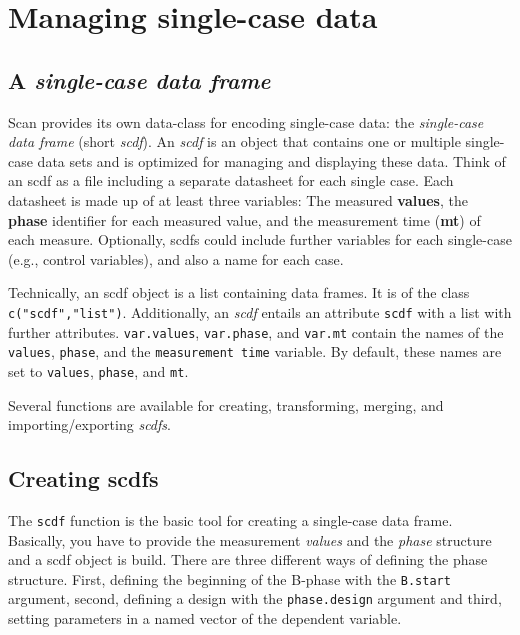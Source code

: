 \documentclass[
]{book}
\makeatletter
\newenvironment{kframe}{%
\medskip{}
\setlength{\fboxsep}{.8em}
 \def\at@end@of@kframe{}%
 \ifinner\ifhmode%
  \def\at@end@of@kframe{\end{minipage}}%
  \begin{minipage}{\columnwidth}%
 \fi\fi%
 \def\FrameCommand##1{\hskip\@totalleftmargin \hskip-\fboxsep
 \colorbox{shadecolor}{##1}\hskip-\fboxsep
     \hskip-\linewidth \hskip-\@totalleftmargin \hskip\columnwidth}%
 \MakeFramed {\advance\hsize-\width
   \@totalleftmargin\z@ \linewidth\hsize
   \@setminipage}}%
 {\par\unskip\endMakeFramed%
 \at@end@of@kframe}
\newenvironment{rmdblock}[1]
  {
  \begin{itemize}
  \renewcommand{\labelitemi}{
    \raisebox{-.7\height}[0pt][0pt]{
      {\setkeys{Gin}{width=3em,keepaspectratio}\texttt{[image: images/\#1]}}
    }
  }
  \setlength{\fboxsep}{1em}
  \begin{kframe}
  \item
  }
  {
  \end{kframe}
  \end{itemize}
  }
\newenvironment{rmdnote}
  {\begin{rmdblock}{bulp}}
{\end{rmdblock}}
\makeatother
\begin{document}
\hypertarget{managing-single-case-data}{%
\chapter{Managing single-case data}\label{managing-single-case-data}}

\hypertarget{a-single-case-data-frame}{%
\section{\texorpdfstring{A \textbf{\emph{single-case data frame}}}{A single-case data frame}}\label{a-single-case-data-frame}}

Scan provides its own data-class for encoding single-case data: the \emph{single-case data frame} (short \emph{scdf}). An \emph{scdf} is an object that contains one or multiple single-case data sets and is optimized for managing and displaying these data. Think of an scdf as a file including a separate datasheet for each single case. Each datasheet is made up of at least three variables: The measured \textbf{values}, the \textbf{phase} identifier for each measured value, and the measurement time (\textbf{mt}) of each measure. Optionally, scdfs could include further variables for each single-case (e.g., control variables), and also a name for each case.

\begin{rmdnote}
Technically, an scdf object is a list containing data frames. It is of
the class \texttt{c("scdf","list")}. Additionally, an \emph{scdf}
entails an attribute \texttt{scdf} with a list with further attributes.
\texttt{var.values}, \texttt{var.phase}, and \texttt{var.mt} contain the
names of the \texttt{values}, \texttt{phase}, and the
\texttt{measurement\ time} variable. By default, these names are set to
\texttt{values}, \texttt{phase}, and \texttt{mt}.
\end{rmdnote}

Several functions are available for creating, transforming, merging, and importing/exporting \emph{scdfs}.

\hypertarget{creating-scdfs}{%
\section{Creating scdfs}\label{creating-scdfs}}

The \texttt{scdf} function is the basic tool for creating a single-case data frame. Basically, you have to provide the measurement \emph{values} and the \emph{phase} structure and a scdf object is build. There are three different ways of defining the phase structure. First, defining the beginning of the B-phase with the \texttt{B.start} argument, second, defining a design with the \texttt{phase.design} argument and third, setting parameters in a named vector of the dependent variable.
\end{document}
